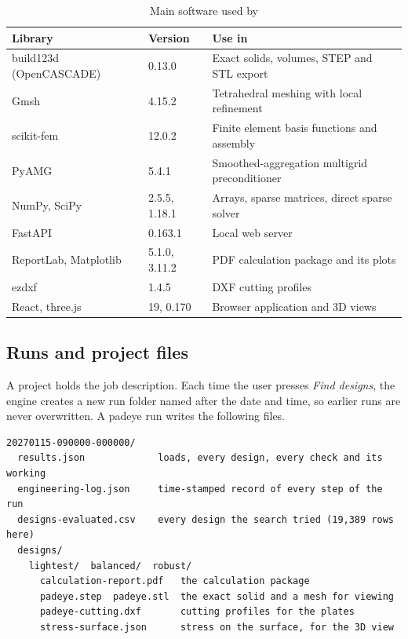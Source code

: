 \begin{table}[H]
\centering
\caption{Main software used by \NEMO{}}
\label{tab:software}
\small
\begin{tabularx}{\textwidth}{llX}
\toprule
\textbf{Library} & \textbf{Version} & \textbf{Use in \NEMO{}}\\
\midrule
build123d (OpenCASCADE) & 0.13.0 & Exact solids, volumes, STEP and STL export\\
Gmsh & 4.15.2 & Tetrahedral meshing with local refinement \cite{gmsh2009}\\
scikit-fem & 12.0.2 & Finite element basis functions and assembly \cite{skfem2020}\\
PyAMG & 5.4.1 & Smoothed-aggregation multigrid preconditioner \cite{pyamg2023}\\
NumPy, SciPy & 2.5.5, 1.18.1 & Arrays, sparse matrices, direct sparse solver\\
FastAPI & 0.163.1 & Local web server\\
ReportLab, Matplotlib & 5.1.0, 3.11.2 & PDF calculation package and its plots\\
ezdxf & 1.4.5 & DXF cutting profiles\\
React, three.js & 19, 0.170 & Browser application and 3D views\\
\bottomrule
\end{tabularx}
\end{table}

\subsection{Runs and project files}
\label{sec:run-files}

A project holds the job description. Each time the user presses
\emph{Find designs}, the engine creates a new run folder named after the date
and time, so earlier runs are never overwritten. A padeye run writes the
following files.

\begin{lstlisting}[language={}, numbers=none, caption={Files written by one padeye run}, label={lst:run-folder}]
20270115-090000-000000/
  results.json             loads, every design, every check and its working
  engineering-log.json     time-stamped record of every step of the run
  designs-evaluated.csv    every design the search tried (19,389 rows here)
  designs/
    lightest/  balanced/  robust/
      calculation-report.pdf   the calculation package
      padeye.step  padeye.stl  the exact solid and a mesh for viewing
      padeye-cutting.dxf       cutting profiles for the plates
      stress-surface.json      stress on the surface, for the 3D view
\end{lstlisting}

